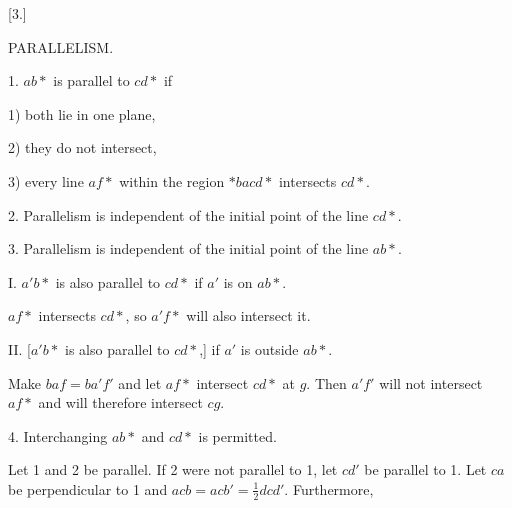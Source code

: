 \begin{center}
[3.]

PARALLELISM.
\end{center}

1. $ab\ast $ is parallel to $cd\ast $ if

1) both lie in one plane,

2) they do not intersect,

3) every line $af\ast $ within the region $\ast bacd\ast $ intersects $cd\ast $.

\begin{center}

\end{center}

2. Parallelism is independent of the initial point of the line $cd\ast $.

3. Parallelism is independent of the initial point of the line $ab\ast $.

I. $a'b\ast $ is also parallel to $cd\ast $ if $a'$ is on $ab\ast $.

 $af\ast $ intersects $cd\ast $, so $a'f\ast $ will also intersect it.

II. [$a'b\ast $ is also parallel to $cd\ast $,] if $a'$ is outside $ab\ast $.

\begin{center}

\end{center}

Make $baf = ba'f'$ and let $af\ast $ intersect $cd\ast $ at $g$. Then $a'f'$ will not intersect $af\ast $ and will therefore intersect $cg$.

4. Interchanging $ab\ast $ and $cd\ast $ is permitted.

\begin{center}

\end{center}

Let 1 and 2 be parallel. If 2 were not parallel to 1, let $cd'$ be parallel to 1. Let $ca$ be perpendicular to 1 and $acb = acb' = \frac{1}{2}dcd'$. Furthermore,
